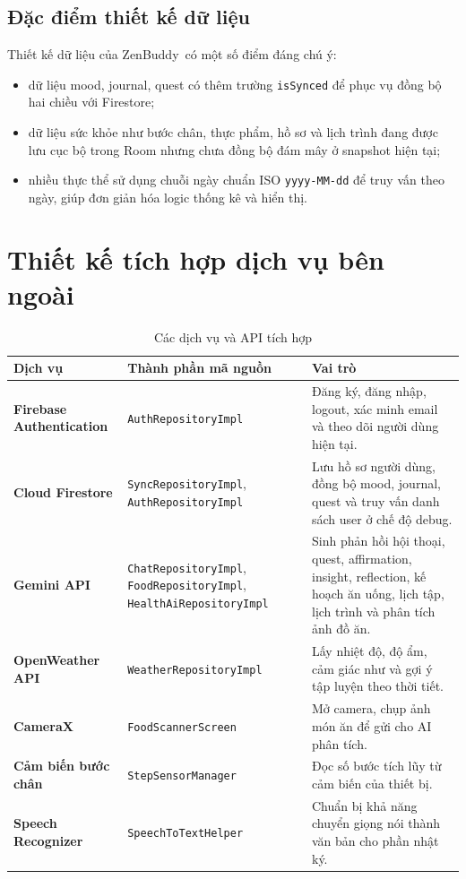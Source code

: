 \documentclass{zenbuddy-report}
\newcommand{\appname}{ZenBuddy}
\begin{document}

\subsection{Đặc điểm thiết kế dữ liệu}
Thiết kế dữ liệu của \appname\ có một số điểm đáng chú ý:
\begin{itemize}
  \item dữ liệu mood, journal, quest có thêm trường \texttt{isSynced} để phục vụ đồng bộ hai chiều với Firestore;
  \item dữ liệu sức khỏe như bước chân, thực phẩm, hồ sơ và lịch trình đang được lưu cục bộ trong Room nhưng chưa đồng bộ đám mây ở snapshot hiện tại;
  \item nhiều thực thể sử dụng chuỗi ngày chuẩn ISO \texttt{yyyy-MM-dd} để truy vấn theo ngày, giúp đơn giản hóa logic thống kê và hiển thị.
\end{itemize}

\section{Thiết kế tích hợp dịch vụ bên ngoài}
\begin{table}[H]
\centering
\caption{Các dịch vụ và API tích hợp}
\label{tab:integration}
\begin{tabularx}{\textwidth}{>{\bfseries}p{3.2cm}p{3.3cm}X}
\toprule
Dịch vụ & Thành phần mã nguồn & Vai trò \\
\midrule
Firebase Authentication & \texttt{AuthRepositoryImpl} & Đăng ký, đăng nhập, logout, xác minh email và theo dõi người dùng hiện tại. \\
Cloud Firestore & \texttt{SyncRepositoryImpl}, \texttt{AuthRepositoryImpl} & Lưu hồ sơ người dùng, đồng bộ mood, journal, quest và truy vấn danh sách user ở chế độ debug. \\
Gemini API & \texttt{ChatRepositoryImpl}, \texttt{FoodRepositoryImpl}, \texttt{HealthAiRepositoryImpl} & Sinh phản hồi hội thoại, quest, affirmation, insight, reflection, kế hoạch ăn uống, lịch tập, lịch trình và phân tích ảnh đồ ăn. \\
OpenWeather API & \texttt{WeatherRepositoryImpl} & Lấy nhiệt độ, độ ẩm, cảm giác như và gợi ý tập luyện theo thời tiết. \\
CameraX & \texttt{FoodScannerScreen} & Mở camera, chụp ảnh món ăn để gửi cho AI phân tích. \\
Cảm biến bước chân & \texttt{StepSensorManager} & Đọc số bước tích lũy từ cảm biến của thiết bị. \\
Speech Recognizer & \texttt{SpeechToTextHelper} & Chuẩn bị khả năng chuyển giọng nói thành văn bản cho phần nhật ký. \\
\bottomrule
\end{tabularx}
\end{table}
\end{document}
